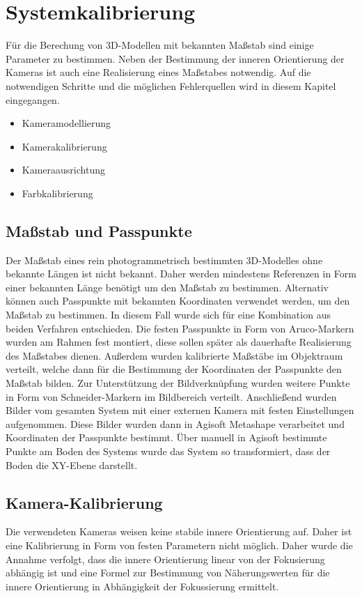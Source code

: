 \documentclass[./00PhotoBox.tex]{subfiles}
\begin{document}
\chapter{Systemkalibrierung}

Für die Berechung von 3D-Modellen mit bekannten Maßstab sind einige Parameter zu bestimmen. Neben der Bestimmung der inneren Orientierung der Kameras ist auch eine Realisierung eines Maßstabes notwendig. Auf die notwendigen Schritte und die möglichen Fehlerquellen wird in diesem Kapitel eingegangen.

\begin{itemize}
    \item Kameramodellierung
    \item Kamerakalibrierung
    \item Kameraausrichtung
    \item Farbkalibrierung
\end{itemize}

\section{Maßstab und Passpunkte}
\label{sec:passpunkte}
Der Maßstab eines rein photogrammetrisch bestimmten 3D-Modelles ohne bekannte Längen ist nicht bekannt. Daher werden mindestens Referenzen in Form einer bekannten Länge benötigt um den Maßstab zu bestimmen. Alternativ können auch Passpunkte mit bekannten Koordinaten verwendet werden, um den Maßstab zu bestimmen. In diesem Fall wurde sich für eine Kombination aus beiden Verfahren entschieden. Die festen Passpunkte in Form von Aruco-Markern wurden am Rahmen fest montiert, diese sollen später als dauerhafte Realisierung des Maßstabes dienen. Außerdem wurden kalibrierte Maßstäbe im Objektraum verteilt, welche dann für die Bestimmung der Koordinaten der Passpunkte den Maßstab bilden. Zur Unterstützung der Bildverknüpfung wurden weitere Punkte in Form von Schneider-Markern im Bildbereich verteilt. Anschließend wurden Bilder vom gesamten System mit  einer externen Kamera mit festen Einstellungen aufgenommen. Diese Bilder wurden dann in Agisoft Metashape verarbeitet und Koordinaten der Passpunkte bestimmt. Über manuell in Agisoft bestimmte Punkte am Boden des Systems wurde das System so transformiert, dass der Boden die XY-Ebene darstellt.

\section{Kamera-Kalibrierung}
Die verwendeten Kameras weisen keine stabile innere Orientierung auf. Daher ist eine Kalibrierung in Form von festen Parametern nicht möglich. Daher wurde die Annahme verfolgt, dass die innere Orientierung linear von der Fokusierung abhängig ist und eine Formel zur Bestimmung von Näherungswerten für die innere Orientierung in Abhängigkeit der Fokussierung ermittelt.
\end{document}
